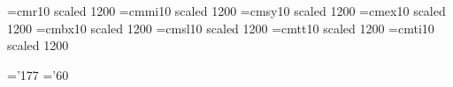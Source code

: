 



\font\twelverm=cmr10 scaled 1200    \font\twelvei=cmmi10 scaled 1200
\font\twelvesy=cmsy10 scaled 1200   \font\twelveex=cmex10 scaled 1200
\font\twelvebf=cmbx10 scaled 1200   \font\twelvesl=cmsl10 scaled 1200
\font\twelvett=cmtt10 scaled 1200   \font\twelveit=cmti10 scaled 1200

\skewchar\twelvei='177   \skewchar\twelvesy='60


\def\twelvepoint{\normalbaselineskip=12.4pt
  \abovedisplayskip 12.4pt plus 3pt minus 9pt
  \belowdisplayskip 12.4pt plus 3pt minus 9pt
  \abovedisplayshortskip 0pt plus 3pt
  \belowdisplayshortskip 7.2pt plus 3pt minus 4pt
  \smallskipamount=3.6pt plus1.2pt minus1.2pt
  \medskipamount=7.2pt plus2.4pt minus2.4pt
  \bigskipamount=14.4pt plus4.8pt minus4.8pt
  \def\rm{\fam0\twelverm}          \def\it{\fam\itfam\twelveit}%
  \def\sl{\fam\slfam\twelvesl}     \def\bf{\fam\bffam\twelvebf}%
  \def\mit{\fam 1}                 \def\cal{\fam 2}%
  \def\tt{\twelvett}
  \textfont0=\twelverm   \scriptfont0=\tenrm   \scriptscriptfont0=\sevenrm
  \textfont1=\twelvei    \scriptfont1=\teni    \scriptscriptfont1=\seveni
  \textfont2=\twelvesy   \scriptfont2=\tensy   \scriptscriptfont2=\sevensy
  \textfont3=\twelveex   \scriptfont3=\twelveex  \scriptscriptfont3=\twelveex
  \textfont\itfam=\twelveit
  \textfont\slfam=\twelvesl
  \textfont\bffam=\twelvebf \scriptfont\bffam=\tenbf
  \scriptscriptfont\bffam=\sevenbf
  \normalbaselines\rm}


